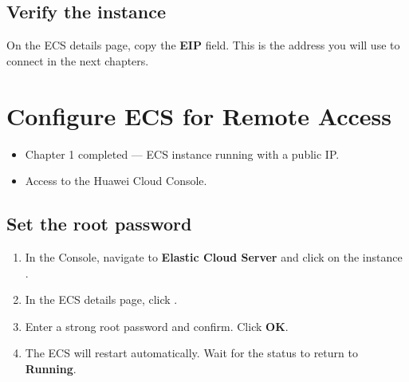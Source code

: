 \documentclass{guide}
\begin{document}
\subsection{Verify the instance}

On the ECS details page, copy the \textbf{EIP} field. This is the address you
will use to connect in the next chapters.

\section{Configure ECS for Remote Access}

\begin{objectives}

  \prerequisites
  \begin{itemize}
    \item Chapter 1 completed — ECS instance running with a public IP.
    \item Access to the Huawei Cloud Console.
  \end{itemize}
\end{objectives}

\subsection{Set the root password}


\stepbystep
\begin{enumerate}
  \item In the Console, navigate to \textbf{Elastic Cloud Server} and click
        on the instance .
  \item In the ECS details page, click .


  \item Enter a strong root password and confirm. Click \textbf{OK}.
  \item The ECS will restart automatically. Wait for the status to return
        to \textbf{Running}.
\end{enumerate}
\end{document}
